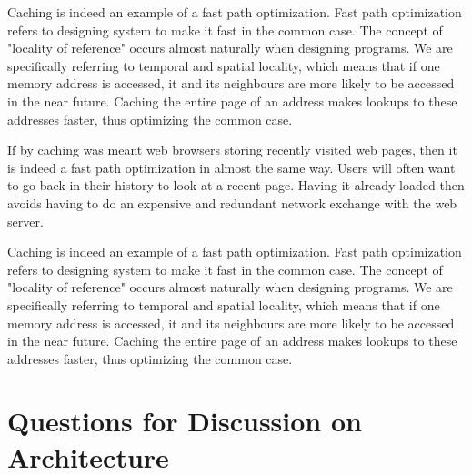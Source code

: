 \documentclass[11pt]{article}
\begin{document}
\begin{enumerate}
    Caching is indeed an example of a fast path optimization. Fast path optimization
    refers to designing system to make it fast in the common case. The concept of
    "locality of reference" occurs almost naturally when designing programs.
    We are specifically referring to temporal and spatial locality, which means that
    if one memory address is accessed, it and its neighbours are more likely to be
    accessed in the near future. Caching the entire page of an address makes lookups
    to these addresses faster, thus optimizing the common case.

    If by caching was meant web browsers storing recently visited web pages,
    then it is indeed a fast path optimization in almost the same way. Users
    will often want to go back in their history to look at a recent page. Having
    it already loaded then avoids having to do an expensive and redundant
    network exchange with the web server.
\end{enumerate}


Caching is indeed an example of a fast path optimization. Fast path optimization
refers to designing system to make it fast in the common case. The concept of
"locality of reference" occurs almost naturally when designing programs.
We are specifically referring to temporal and spatial locality, which means that
if one memory address is accessed, it and its neighbours are more likely to be
accessed in the near future. Caching the entire page of an address makes lookups
to these addresses faster, thus optimizing the common case.

\section{Questions for Discussion on Architecture}
\end{document}
